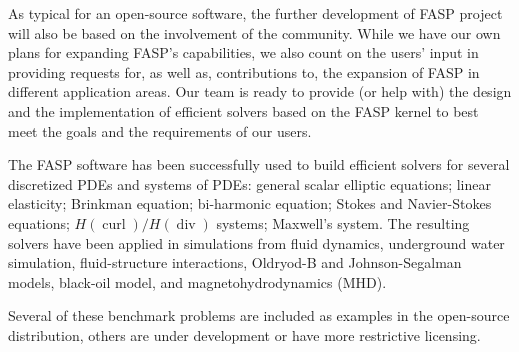 \documentclass[11pt]{memoir}
\begin{document}
As typical for an open-source software, the further development of
FASP project will also be based on the involvement of the community.
While we have our own plans for expanding FASP's capabilities, we also
count on the users' input in providing requests for, as well as,
contributions to, the expansion of FASP in different application
areas. Our team is ready to provide (or help with) the design and the
implementation of efficient solvers based on the FASP kernel to best
meet the goals and the requirements of our users.

The FASP software has been successfully used to build efficient
solvers for several discretized PDEs and systems of PDEs: general
scalar elliptic equations; linear elasticity; Brinkman equation;
bi-harmonic equation; Stokes and Navier-Stokes equations;
$H(\operatorname{curl})/H(\operatorname{div})$ systems; Maxwell's
system. The resulting solvers have been applied in simulations from
fluid dynamics, underground water simulation, fluid-structure
interactions, Oldryod-B and Johnson-Segalman models, black-oil model,
and magnetohydrodynamics (MHD).

Several of these benchmark problems are included as examples in
the open-source distribution, others are under development or have
more restrictive licensing.

%






\end{document}
